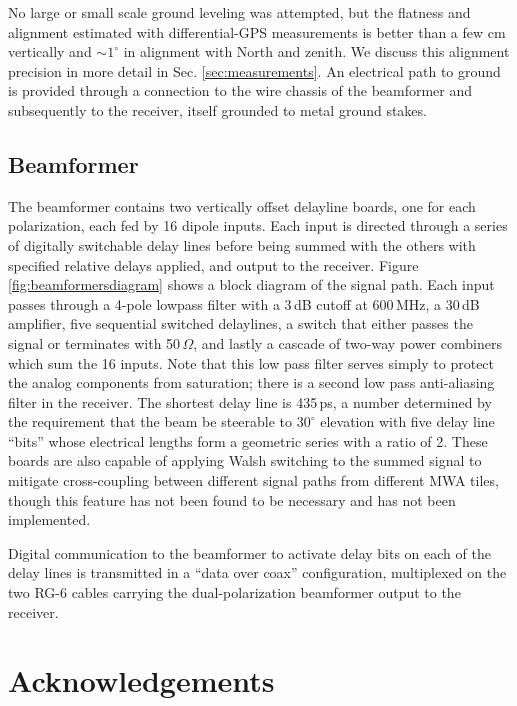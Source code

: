 \begin{subappendices}
No large or small scale ground leveling was attempted, but the flatness and alignment estimated with  differential-GPS measurements is better than a few cm vertically and $\sim1^\circ$ in alignment with North and zenith. We discuss this alignment precision in more detail in Sec. \ref{sec:measurements}. An electrical path to ground is provided through a connection to the wire chassis of the beamformer and subsequently to the receiver, itself grounded to metal ground stakes.

\subsection{Beamformer}
The beamformer contains two vertically offset delayline boards, one for each polarization, each fed by 16 dipole inputs. Each input is directed through a series of digitally switchable delay lines before being summed with the others with specified relative delays applied, and output to the receiver. Figure \ref{fig:beamformersdiagram} shows a block diagram of the signal path. Each input passes through a 4-pole lowpass filter with a 3\,dB cutoff at 600\,MHz, a 30\,dB amplifier, five sequential switched delaylines, a switch that either passes the signal or terminates with 50\,$\Omega$, and lastly a cascade of two-way power combiners which sum the 16 inputs. Note that this low pass filter serves simply to protect the analog components from saturation; there is a second low pass anti-aliasing filter in the receiver. The shortest delay line is 435\,ps, a number determined by the requirement that the beam be steerable to $30^\circ$ elevation with five delay line ``bits'' whose electrical lengths form a geometric series with a ratio of 2. These boards are also capable of applying Walsh switching to the summed signal to mitigate cross-coupling between different signal paths from different MWA tiles, though this feature has not been found to be necessary and has not been implemented. 

Digital communication to the beamformer to activate delay bits on each of the delay lines is transmitted in a ``data over coax'' configuration, multiplexed on the two RG-6 cables carrying the dual-polarization beamformer output to the receiver. 

\end{subappendices}

\section*{Acknowledgements}

